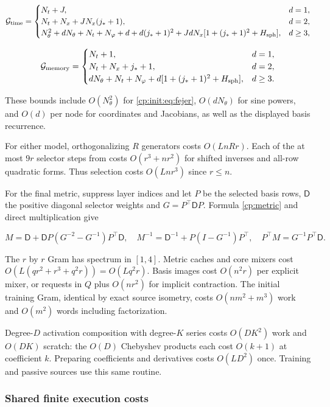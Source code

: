 \[
\mathcal G_{\rm time}=\begin{cases}
N_t+J,&d=1,\\
N_t+N_x+JN_x(j_*+1),&d=2,\\
N_\theta^2+dN_\theta+N_t+N_\varphi+d+d(j_*+1)^2
 +JdN_x[1+(j_*+1)^2+H_{\rm sph}],&d\ge3,
\end{cases}
\]

\begin{equation}
\label{cp:init:eq:geometry-counts}
\mathcal G_{\rm memory}=\begin{cases}
N_t+1,&d=1,\\
N_t+N_x+j_*+1,&d=2,\\
dN_\theta+N_t+N_\varphi+d[1+(j_*+1)^2+H_{\rm sph}],&d\ge3.
\end{cases}
\end{equation}

These bounds include $O(N_\theta^2)$ for \eqref{cp:init:eq:fejer},
$O(dN_\theta)$ for sine powers, and $O(d)$ per node for coordinates
and Jacobians, as well as the displayed basis recurrence.

For either model, orthogonalizing $R$ generators costs $O(LnRr)$.
Each of the at most $9r$ selector steps from 
costs $O(r^3+nr^2)$ for shifted inverses and all-row quadratic forms.
Thus selection costs $O(Lnr^3)$ since $r\le n$.

For the final metric, suppress layer indices and let $P$ be the
selected basis rows, $\mathsf D$ the positive diagonal selector
weights and $G=P^\top\mathsf DP$. Formula \eqref{cp:metric}
and direct multiplication give

\[
M=\mathsf D+\mathsf DP(G^{-2}-G^{-1})P^\top\mathsf D,\quad
M^{-1}=\mathsf D^{-1}+P(I-G^{-1})P^\top,\quad
P^\top M=G^{-1}P^\top\mathsf D.
\]

The $r$ by $r$ Gram has spectrum in $[1,4]$. Metric caches and
core mixers cost $O(L(qr^2+r^3+q^2r))=O(Lq^2r)$.
Basis images cost $O(n^2r)$ per explicit mixer, or requests in $Q$
plus $O(nr^2)$ for implicit contraction. The initial training Gram,
identical by exact source isometry, costs $O(nm^2+m^3)$ work and
$O(m^2)$ words including factorization.

Degree-$D$ activation composition with degree-$K$ series costs
$O(DK^2)$ work and $O(DK)$ scratch: the $O(D)$ Chebyshev
products each cost $O(k+1)$ at coefficient $k$.
Preparing coefficients and derivatives costs $O(LD^2)$ once.
Training and passive sources use this same routine.

\subsubsection{Shared finite execution costs}
\label{cp:init:sec:explicit-costs}
\label{cp:init:sec:implicit-costs}

